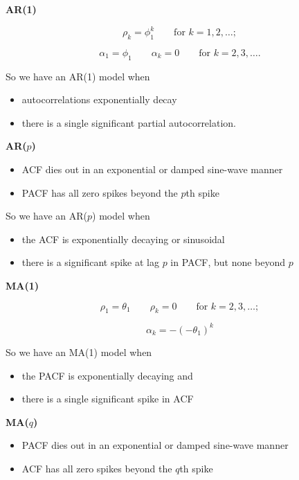 \documentclass[]{book}
\providecommand{\tightlist}{%
  \setlength{\itemsep}{0pt}\setlength{\parskip}{0pt}}
\begin{document}
\textbf{AR(1)}

\[\rho_k = \phi_1^k\qquad\text{for } k=1,2,\dots;\]

\[\alpha_1 = \phi_1 \qquad\alpha_k = 0\qquad\text{for } k=2,3,\dots.\]

So we have an AR(1) model when

\begin{itemize}
\tightlist
\item
  autocorrelations exponentially decay
\item
  there is a single significant partial autocorrelation.
\end{itemize}

\textbf{AR(\(p\))}

\begin{itemize}
\tightlist
\item
  ACF dies out in an exponential or damped sine-wave manner
\item
  PACF has all zero spikes beyond the \(p\)th spike
\end{itemize}

So we have an AR(\(p\)) model when

\begin{itemize}
\tightlist
\item
  the ACF is exponentially decaying or sinusoidal
\item
  there is a significant spike at lag \(p\) in PACF, but none beyond \(p\)
\end{itemize}

\textbf{MA(1)}

\[\rho_1 = \theta_1\qquad \rho_k = 0\qquad\text{for  }k=2,3,\dots;\]

\[\alpha_k = -(-\theta_1)^k\]

So we have an MA(1) model when

\begin{itemize}
\tightlist
\item
  the PACF is exponentially decaying and
\item
  there is a single significant spike in ACF
\end{itemize}

\textbf{MA(\(q\))}

\begin{itemize}
\tightlist
\item
  PACF dies out in an exponential or damped sine-wave manner
\item
  ACF has all zero spikes beyond the \(q\)th spike
\end{itemize}
\end{document}
